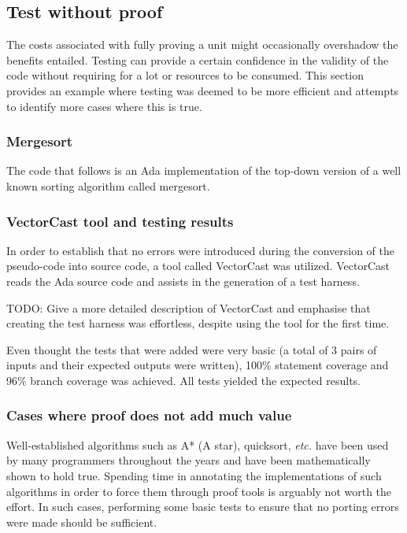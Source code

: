 \documentclass{llncs} \usepackage[utf8]{inputenc} \usepackage{url}
\newcommand{\vectorcast}{VectorCast\xspace}
\newcommand{\etc}{\textit{etc.}\xspace}
\begin{document}
\subsection{Test without proof}
The costs associated with fully proving a unit might occasionally
overshadow the benefits entailed. Testing can provide a certain
confidence in the validity of the code without requiring for a lot or
resources to be consumed. This section provides an example where
testing was deemed to be more efficient and attempts to identify more
cases where this is true.

\subsubsection{Mergesort}
The code that follows is an Ada implementation of the top-down version
of a well known sorting algorithm called mergesort.
 

\subsubsection{\vectorcast tool and testing results}
In order to establish that no errors were introduced during the
conversion of the pseudo-code into source code, a tool called
\vectorcast was utilized. \vectorcast reads the Ada source code and
assists in the generation of a test harness.

TODO: Give a more detailed description of \vectorcast and emphasise
that creating the test harness was effortless, despite using the tool
for the first time.

Even thought the tests that were added were very basic (a total of 3
pairs of inputs and their expected outputs were written), 100\%
statement coverage and 96\% branch coverage was achieved. All tests
yielded the expected results.

\subsubsection{Cases where proof does not add much value}
Well-established algorithms such as A* (A star), quicksort, \etc have
been used by many programmers throughout the years and have been
mathematically shown to hold true. Spending time in annotating the
implementations of such algorithms in order to force them through
proof tools is arguably not worth the effort. In such cases,
performing some basic tests to ensure that no porting errors were made
should be sufficient.
\end{document}

